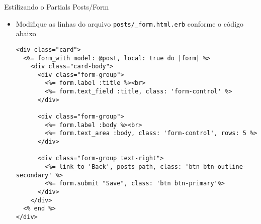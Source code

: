 \begin{frame}{Estilizando o Partials Posts$/$Form}
    \begin{itemize}
      \item Modifique as linhas do arquivo \verb|posts/_form.html.erb| conforme o código abaixo
      \begin{lstlisting}[style=RubyInputStyle, basicstyle=\tiny\ttfamily, caption=app/views/posts/\_form.html.erb]
<div class="card">
  <%= form_with model: @post, local: true do |form| %>
    <div class="card-body">
      <div class="form-group">
        <%= form.label :title %><br>
        <%= form.text_field :title, class: 'form-control' %>
      </div>
      
      <div class="form-group">
        <%= form.label :body %><br>
        <%= form.text_area :body, class: 'form-control', rows: 5 %>
      </div>
      
      <div class="form-group text-right">
        <%= link_to 'Back', posts_path, class: 'btn btn-outline-secondary' %>
        <%= form.submit "Save", class: 'btn btn-primary'%>
      </div>
    </div>
  <% end %>	
</div>
    \end{lstlisting}
  \end{itemize}
\end{frame} 
